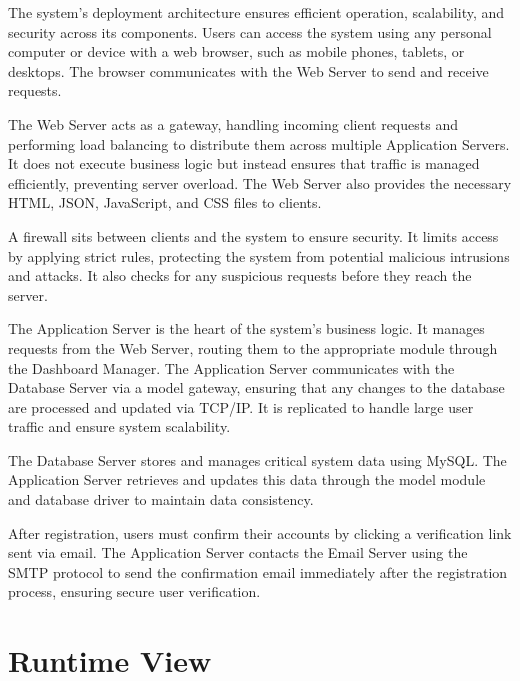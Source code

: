 The system's deployment architecture ensures efficient operation, scalability, and security across its components. Users can access the system using any personal computer or device with a web browser, such as mobile phones, tablets, or desktops. The browser communicates with the Web Server to send and receive requests.

The Web Server acts as a gateway, handling incoming client requests and performing load balancing to distribute them across multiple Application Servers. It does not execute business logic but instead ensures that traffic is managed efficiently, preventing server overload. The Web Server also provides the necessary HTML, JSON, JavaScript, and CSS files to clients.

A firewall sits between clients and the system to ensure security. It limits access by applying strict rules, protecting the system from potential malicious intrusions and attacks. It also checks for any suspicious requests before they reach the server.

The Application Server is the heart of the system's business logic. It manages requests from the Web Server, routing them to the appropriate module through the Dashboard Manager. The Application Server communicates with the Database Server via a model gateway, ensuring that any changes to the database are processed and updated via TCP/IP. It is replicated to handle large user traffic and ensure system scalability.

The Database Server stores and manages critical system data using MySQL. The Application Server retrieves and updates this data through the model module and database driver to maintain data consistency.

After registration, users must confirm their accounts by clicking a verification link sent via email. The Application Server contacts the Email Server using the SMTP protocol to send the confirmation email immediately after the registration process, ensuring secure user verification.


\newpage
\section{Runtime View}


